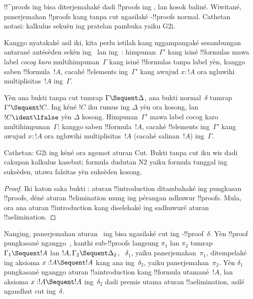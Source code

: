 \documentclass[../../../include/open-logic-section]{subfiles}
\begin{document}


!!^{proof}s ing  bisa diterjemahaké dadi !!{proof}s ing
, lan kosok baliné. Wiwitané, panerjemahan !!{proof}s
 kang tanpa cut ngasilaké -!!{proof}s normal.
Cathetan notasi: kalkulus sekuèn ing pratelan pambuka yaiku G2i.

Kanggo nyatakaké asil iki, kita perlu istilah kang nggampangaké
sesambungan antarané antésèden sekèn ing~ lan
ing~: himpunan~$\Gamma'$ kang isiné !!{formula}s mawa
label \emph{cocog karo} multihimpunan~$\Gamma$ kang isiné
!!{formula}s tanpa label yèn, kanggo saben !!{formula}~$!A$,
cacahé !!{element}s ing~$\Gamma'$ kang awujud $x : !A$ ora
ngluwihi multiplisitas~$!A$ ing~$\Gamma$.

\begin{cor}
Yèn ana bukti  tanpa cut tumrap
$\Gamma \Sequent \Delta$, ana bukti  normal~$\delta$
tumrap $\Gamma' \Sequent !C$. Ing kéné $!C$ iku rumus ing
$\Delta$ yèn ora kosong, lan $!C \ident \lfalse$ yèn
$\Delta$ kosong. Himpunan~$\Gamma'$ mawa
label cocog karo multihimpunan~$\Gamma$: kanggo saben
!!{formula}~$!A$, cacahé !!{element}s ing~$\Gamma'$ kang awujud
$x : !A$ ora ngluwihi multiplisitas~$!A$ (cacahé salinan~$!A$)
ing~$\Gamma$.
\end{cor}
Cathetan: G2i ing kéné ora ngemot aturan Cut. Bukti tanpa cut iku wis dadi cakupan kalkulus kasebut; formula dudutan N2 yaiku formula tunggal ing suksèden, utawa falsitas yèn suksèden kosong.

\begin{proof}
Iki katon saka bukti :
aturan !!{introduction} ditambahaké ing pungkasan !!{proof}s,
déné aturan !!{elimination} mung ing pérangan ndhuwur
!!{proof}s. Mula, ora ana aturan !!{introduction} kang
diselehaké ing sadhuwuré aturan !!a{elimination}.
\end{proof}

Nanging, panerjemahan aturan~\Cut{} ing
 bisa ngasilaké cut ing
-!!{proof}~$\delta$. Yèn !!{proof}  pungkasané
nganggo~\Cut{}, kanthi sub-!!{proof}s langsung $\pi_1$ lan $\pi_2$
tumrap $\Gamma_1 \Sequent !A$ lan $!A, \Gamma_2 \Sequent \Delta_2$,
~$\delta_1$, yaiku panerjemahan~$\pi_1$, ditempelaké ing aksioma
$x:!A \Sequent !A$ kang ana ing~$\delta_2$, yaiku panerjemahan~$\pi_2$.
Yèn $\delta_1$ pungkasané nganggo aturan !!a{introduction} kang
!!{formula} utamané~$!A$, lan aksioma $x:!A \Sequent !A$ ing~$\delta_2$
dadi premis utama aturan !!a{elimination}, asilé ngandhut cut
ing~$\delta$.
\end{document}
